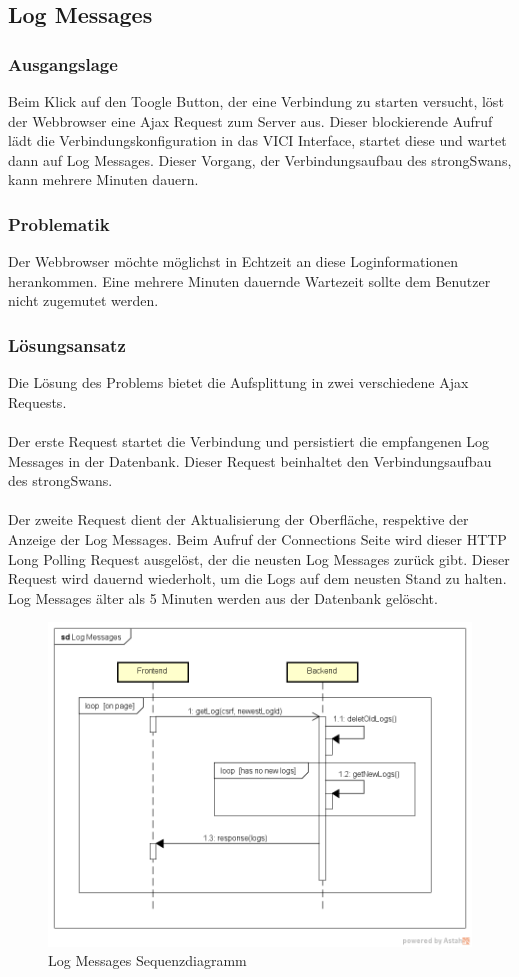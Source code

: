 \newpage
\subsection{Log Messages}
\subsubsection{Ausgangslage}
Beim Klick auf den Toogle Button, der eine Verbindung zu starten versucht, löst der Webbrowser eine Ajax Request zum Server aus. Dieser blockierende Aufruf lädt die Verbindungskonfiguration in das VICI Interface, startet diese und wartet dann auf Log Messages. Dieser Vorgang, der Verbindungsaufbau des strongSwans, kann mehrere Minuten dauern.


\subsubsection{Problematik}
Der Webbrowser möchte möglichst in Echtzeit an diese Loginformationen herankommen. Eine mehrere Minuten dauernde Wartezeit sollte dem Benutzer nicht zugemutet werden.

\subsubsection{Lösungsansatz}
Die Lösung des Problems bietet die Aufsplittung in zwei verschiedene Ajax Requests.\\\\
Der erste Request startet die Verbindung und persistiert die empfangenen Log Messages in der Datenbank. Dieser Request beinhaltet den Verbindungsaufbau des strongSwans.\\\\
Der zweite Request dient der Aktualisierung der Oberfläche, respektive der Anzeige der Log Messages.
Beim Aufruf der Connections Seite wird dieser HTTP Long Polling Request ausgelöst, der die neusten Log Messages zurück gibt. Dieser Request wird dauernd wiederholt, um die Logs auf dem neusten Stand zu halten. Log Messages älter als 5 Minuten werden aus der Datenbank gelöscht. \\
\begin{figure}[H]
\centering
\includegraphics[width=360pt]{images/log_messages_seq.png}
\caption[Log Messages Sequenzdiagramm]{Log Messages Sequenzdiagramm}
\end{figure}